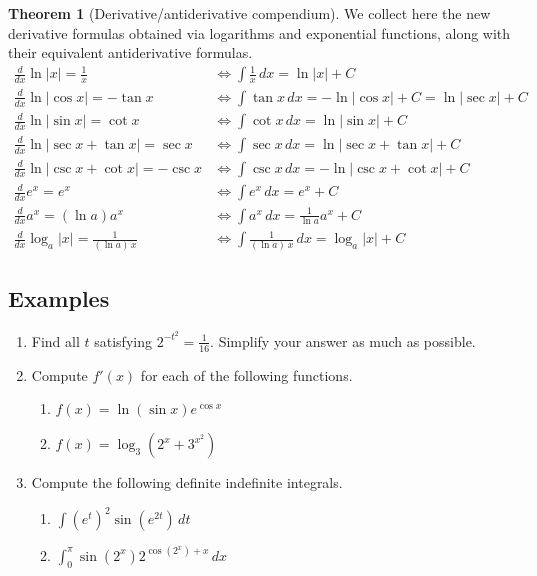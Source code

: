 \documentclass[11pt]{article}
\theoremstyle{definition}
\theoremstyle{named}
\newtheorem*{namedtheorem}{Theorem}
\numberwithin{myalgctr}{section}
\begin{document}
\begin{namedtheorem}[Derivative/antiderivative compendium] We collect here the new derivative formulas obtained via logarithms and exponential functions, along with their equivalent antiderivative formulas.
\begin{align*}
  \frac{d}{dx}\ln\vert x\vert=\frac{1}{x} & \iff \int\frac{1}{x} \, dx=\ln\vert x\vert+C \\
  \frac{d}{dx}\ln\vert \cos x \vert=-\tan x & \iff \int\tan x \, dx=-\ln\vert \cos x \vert+C=\ln\vert\sec x\vert+C \\
  \frac{d}{dx}\ln\vert \sin x\vert=\cot x & \iff \int\cot x \, dx=\ln\vert \sin x\vert+C \\
  \frac{d}{dx}\ln\vert \sec x+\tan x\vert=\sec x & \iff \int\sec x \, dx=\ln\vert \sec x+\tan x\vert+C \\
  \frac{d}{dx}\ln\vert \csc x+\cot x\vert=-\csc x & \iff \int\csc x \, dx=-\ln\vert \csc x+\cot x\vert+C\\
  \frac{d}{dx}e^x=e^x & \iff \int e^x \, dx=e^x+C\\
  \frac{d}{dx}a^x=(\ln a)a^x & \iff \int a^x \, dx=\frac{1}{\ln a}a^x+C\\
  \frac{d}{dx}\log_a \vert x\vert =\frac{1}{(\ln a)\, x} & \iff \int \frac{1}{(\ln a)\, x} \, dx=\log_a\vert x\vert+C
\end{align*}

\end{namedtheorem}




\subsection*{Examples}
\begin{enumerate}
  \item Find all $t$ satisfying $\displaystyle 2^{-t^2}=\frac{1}{16}$. Simplify your answer as much as possible.  
  \item Compute $f'(x)$ for each of the following functions.
  \begin{enumerate}
    \item $f(x)=\ln(\sin x)e^{\cos x}$
    \item $f(x)=\log_3(2^x+3^{x^2})$
  \end{enumerate}
  \item Compute the following definite indefinite integrals.
  \begin{enumerate}
    \item $\displaystyle\int (e^t)^2\sin(e^{2t})\, dt$
    \item $\displaystyle\int_0^\pi \sin(2^x)2^{\cos(2^x)+x}\, dx$
  \end{enumerate}
\end{enumerate}
\end{document}
